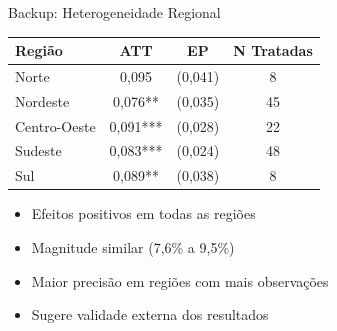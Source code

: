 \documentclass[10pt,aspectratio=169]{beamer}
\begin{document}
\begin{frame}{Backup: Heterogeneidade Regional}
\begin{table}[h]
\centering
\begin{tabular}{lccc}
\toprule
Região & ATT & EP & N Tratadas \\
\midrule
Norte & 0,095 & (0,041) & 8 \\
Nordeste & 0,076** & (0,035) & 45 \\
Centro-Oeste & 0,091*** & (0,028) & 22 \\
Sudeste & 0,083*** & (0,024) & 48 \\
Sul & 0,089** & (0,038) & 8 \\
\bottomrule
\end{tabular}
\end{table}

\begin{itemize}
    \item Efeitos positivos em todas as regiões
    \item Magnitude similar (7,6\% a 9,5\%)
    \item Maior precisão em regiões com mais observações
    \item Sugere validade externa dos resultados
\end{itemize}
\end{frame}
\end{document}
